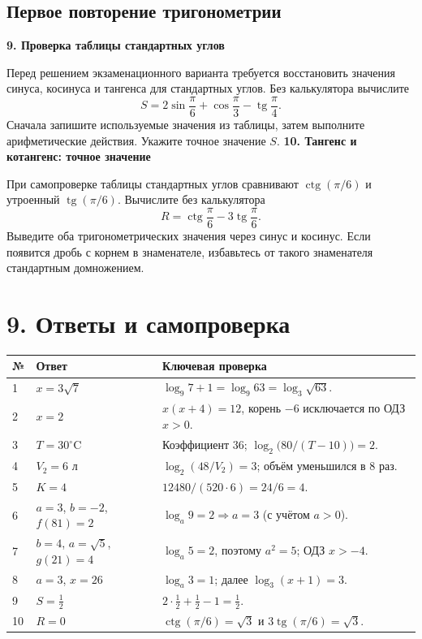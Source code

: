 \documentclass[a4paper,12pt]{article}
\newcommand{\tang}{\mathop{\mathrm{tg}}\nolimits}
\newcommand{\cotang}{\mathop{\mathrm{ctg}}\nolimits}
\newcommand{\task}[2]{\needspace{7\baselineskip}\medskip\textbf{#1. #2}\par}
\begin{document}
\subsection*{Первое повторение тригонометрии}
\task{9}{Проверка таблицы стандартных углов}
Перед решением экзаменационного варианта требуется восстановить значения синуса, косинуса и тангенса для стандартных углов. Без калькулятора вычислите
\[
S=2\sin\frac{\pi}{6}+\cos\frac{\pi}{3}-\tang\frac{\pi}{4}.
\]
Сначала запишите используемые значения из таблицы, затем выполните арифметические действия. Укажите точное значение $S$.
\task{10}{Тангенс и котангенс: точное значение}
При самопроверке таблицы стандартных углов сравнивают $\cotang(\pi/6)$ и утроенный $\tang(\pi/6)$. Вычислите без калькулятора
\[
R=\cotang\frac{\pi}{6}-3\tang\frac{\pi}{6}.
\]
Выведите оба тригонометрических значения через синус и косинус. Если появится дробь с корнем в знаменателе, избавьтесь от такого знаменателя стандартным домножением.
\clearpage
\section*{9. Ответы и самопроверка}
\small
\begin{longtable}{@{}p{11mm}p{41mm}p{100mm}@{}}
\toprule
№ & Ответ & Ключевая проверка \\ \midrule
\endhead
1 & $x=3\sqrt7$ & $\log_9 7+1=\log_9 63=\log_3\sqrt{63}$.\\
2 & $x=2$ & $x(x+4)=12$, корень $-6$ исключается по ОДЗ $x>0$.\\
3 & $T=30^\circ\mathrm C$ & Коэффициент $36$; $\log_2\bigl(80/(T-10)\bigr)=2$.\\
4 & $V_2=6$ л & $\log_2(48/V_2)=3$; объём уменьшился в $8$ раз.\\
5 & $K=4$ & $12480/(520\cdot6)=24/6=4$.\\
6 & $a=3$, $b=-2$, $f(81)=2$ & $\log_a9=2\Rightarrow a=3$ (с учётом $a>0$).\\
7 & $b=4$, $a=\sqrt5$, $g(21)=4$ & $\log_a5=2$, поэтому $a^2=5$; ОДЗ $x>-4$.\\
8 & $a=3$, $x=26$ & $\log_a3=1$; далее $\log_3(x+1)=3$.\\
9 & $S=\frac12$ & $2\cdot\tfrac12+\tfrac12-1=\tfrac12$.\\
10 & $R=0$ & $\cotang(\pi/6)=\sqrt3$ и $3\tang(\pi/6)=\sqrt3$.\\
\bottomrule
\end{longtable}
\normalsize
\end{document}
